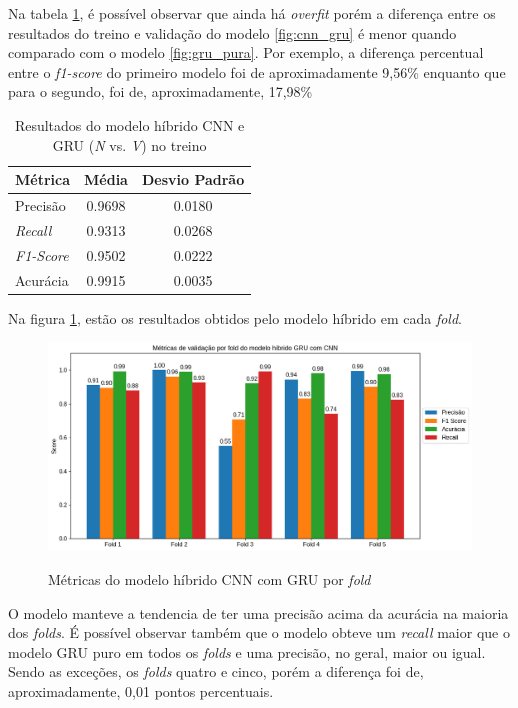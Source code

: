 Na tabela  \ref{tab:resultado_cv_gru_cnn_treino}, é possível observar que ainda há \textit{overfit} porém a diferença entre os resultados
do treino e validação do modelo \ref{fig:cnn_gru} é menor quando comparado com o modelo \ref{fig:gru_pura}. Por exemplo, a 
diferença percentual entre o \textit{f1-score} do primeiro modelo foi de aproximadamente 9,56\% enquanto que para o segundo, foi de, aproximadamente, 17,98\%

\begin{table}[H]
\centering
\caption{Resultados do modelo híbrido CNN e GRU (\textit{N} vs. \textit{V}) no treino}
\label{tab:resultado_cv_gru_cnn_treino}
\begin{tabular}{lcc}
\hline
\textbf{Métrica} & \textbf{Média} & \textbf{Desvio Padrão} \\
\hline
Precisão & 0.9698 &  0.0180 \\
\textit{Recall} & 0.9313  & 0.0268 \\
\textit{F1-Score} & 0.9502 & 0.0222\\
Acurácia & 0.9915 & 0.0035 \\
\hline
\end{tabular}
\end{table}

Na figura \ref{fig:gru_cnn_resultados_por_fold}, estão os resultados obtidos pelo modelo híbrido em cada \textit{fold}.

\begin{figure}[H]
  \centering
  \caption{Métricas do modelo híbrido CNN com GRU por \textit{fold}}
   \includegraphics[width=1.0\textwidth]{figuras/modelos_resultados/gru_cnn/gru_cnn_metricas_por_fold.png} 
  \label{fig:gru_cnn_resultados_por_fold}
\end{figure}

O modelo manteve a tendencia de ter uma precisão acima da acurácia na maioria dos \textit{folds}. É possível observar também que o modelo
obteve um \textit{recall} maior que o modelo GRU puro em todos os \textit{folds} e uma precisão, no geral, maior ou igual. Sendo as exceções,
os \textit{folds} quatro e cinco, porém a diferença foi de, aproximadamente, 0,01 pontos percentuais. 

